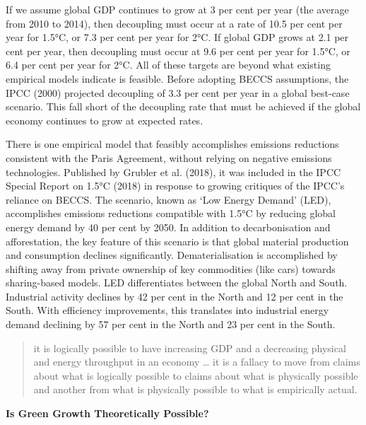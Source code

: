 \documentclass[
]{book}
\begin{document}
If we assume global GDP continues to grow at 3 per cent per year (the average from 2010 to 2014),
then decoupling must occur at a rate of 10.5 per cent per year for 1.5°C,
or 7.3 per cent per year for 2°C.
If global GDP grows at 2.1 per cent per year, then decoupling must occur at 9.6 per cent per
year for 1.5°C, or 6.4 per cent per year for 2°C.
All of these targets are beyond what existing empirical models indicate is feasible.
Before adopting BECCS assumptions, the IPCC (2000) projected decoupling
of 3.3 per cent per year in a global best-case scenario.
This fall short of the decoupling rate that must be achieved if the global economy continues
to grow at expected rates.

There is one empirical model that feasibly accomplishes emissions reductions consistent with the
Paris Agreement, without relying on negative emissions technologies. Published by Grubler et al.
(2018), it was included in the IPCC Special Report on 1.5°C (2018) in response to growing critiques
of the IPCC's reliance on BECCS. The scenario, known as `Low Energy Demand' (LED), accomplishes
emissions reductions compatible with 1.5°C by reducing global energy demand by 40 per cent by
2050. In addition to decarbonisation and afforestation, the key feature of this scenario is that
global material production and consumption declines significantly.
Dematerialisation is accomplished by shifting
away from private ownership of key commodities (like cars) towards sharing-based models. LED
differentiates between the global North and South. Industrial activity declines by 42 per cent in
the North and 12 per cent in the South. With efficiency improvements, this translates into industrial
energy demand declining by 57 per cent in the North and 23 per cent in the South.

\begin{quote}
it is logically possible to have increasing GDP and a decreasing physical and energy throughput in an economy \ldots{}
it is a fallacy to move from claims about what is logically possible to claims about what is physically possible and
another from what is physically possible to what is empirically actual.
\end{quote}

\textbf{Is Green Growth Theoretically Possible?}
\end{document}
